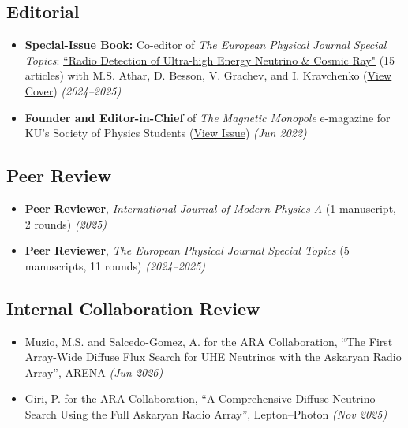 \documentclass[10pt,letterpaper]{report}
\newcommand{\cvdate}[1]{{\normalfont\itshape\color{Muted}(#1)}}
\begin{document}
\subsection*{Editorial}
\begin{itemize}
    \item {\bfseries Special-Issue Book:} Co-editor of \textit{The European Physical Journal Special Topics}: \href{https://link.springer.com/collections/ediiddhcdc}{``Radio Detection of Ultra-high Energy Neutrino \& Cosmic Ray"} (15 articles) with M.S. Athar, D. Besson, V. Grachev, and I. Kravchenko (\href{https://drive.google.com/file/d/10yQDNYlvJac99on-PoZy5NE_O8JWTfhs/view?usp=share_link}{View Cover}) \cvdate{2024--2025}
\item {\bf Founder and Editor-in-Chief} of \textit{The Magnetic Monopole} e-magazine for KU's Society of Physics Students    (\href{https://drive.google.com/file/d/12yfhWqUupWIPWM5WcWdIviUYbVA2GnWY/view?usp=sharing}{View Issue})  \cvdate{Jun 2022}
\end{itemize}

\subsection*{Peer Review}
\begin{itemize}

    \item \textbf{Peer Reviewer}, \textit{International Journal of Modern Physics A} (1 manuscript, 2 rounds) \cvdate{2025}
\item \textbf{Peer Reviewer}, \textit{The European Physical Journal Special Topics} (5 manuscripts, 11 rounds) \cvdate{2024--2025}
\end{itemize}
\subsection*{Internal Collaboration Review}
\begin{itemize}
    \item Muzio, M.S. and Salcedo-Gomez, A. for the ARA Collaboration, ``The First Array-Wide Diffuse Flux Search for UHE Neutrinos with the Askaryan Radio Array'', ARENA \cvdate{Jun 2026}
    \item Giri, P. for the ARA Collaboration, ``A Comprehensive Diffuse Neutrino Search Using the Full Askaryan Radio Array'', Lepton--Photon \cvdate{Nov 2025}
\end{itemize}
\end{document}
